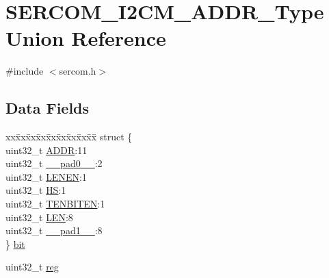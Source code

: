 \hypertarget{union_s_e_r_c_o_m___i2_c_m___a_d_d_r___type}{}\section{S\+E\+R\+C\+O\+M\+\_\+\+I2\+C\+M\+\_\+\+A\+D\+D\+R\+\_\+\+Type Union Reference}
\label{union_s_e_r_c_o_m___i2_c_m___a_d_d_r___type}


{\ttfamily \#include $<$sercom.\+h$>$}

\subsection*{Data Fields}
\begin{DoxyCompactItemize}
\item 
\begin{tabbing}
xx\=xx\=xx\=xx\=xx\=xx\=xx\=xx\=xx\=\kill
struct \{\\
\>uint32\_t \mbox{\hyperlink{union_s_e_r_c_o_m___i2_c_m___a_d_d_r___type_ac9f49eaa00ec245d66e5342c02bcce9f}{ADDR}}:11\\
\>uint32\_t \mbox{\hyperlink{union_s_e_r_c_o_m___i2_c_m___a_d_d_r___type_a3e57c2ef1c3ffb36722f000cc1156824}{\_\_pad0\_\_}}:2\\
\>uint32\_t \mbox{\hyperlink{union_s_e_r_c_o_m___i2_c_m___a_d_d_r___type_ae9e347bd7583f115e98d3c4c73df6a6d}{LENEN}}:1\\
\>uint32\_t \mbox{\hyperlink{union_s_e_r_c_o_m___i2_c_m___a_d_d_r___type_a70f5b0d817b7702877ee11189cad274f}{HS}}:1\\
\>uint32\_t \mbox{\hyperlink{union_s_e_r_c_o_m___i2_c_m___a_d_d_r___type_a7facace59b31af2385d081975411ce42}{TENBITEN}}:1\\
\>uint32\_t \mbox{\hyperlink{union_s_e_r_c_o_m___i2_c_m___a_d_d_r___type_ac9abe173c60a3c362a93caa231f90966}{LEN}}:8\\
\>uint32\_t \mbox{\hyperlink{union_s_e_r_c_o_m___i2_c_m___a_d_d_r___type_a6712ba6dd1d5b43d2d56ff8ac4e275a7}{\_\_pad1\_\_}}:8\\
\} \mbox{\hyperlink{union_s_e_r_c_o_m___i2_c_m___a_d_d_r___type_a06b5d644e6523bdb54cfd8e6a2ab9d0c}{bit}}\\

\end{tabbing}\item 
uint32\+\_\+t \mbox{\hyperlink{union_s_e_r_c_o_m___i2_c_m___a_d_d_r___type_a6b91636401516a477989a336376d7b40}{reg}}
\end{DoxyCompactItemize}


